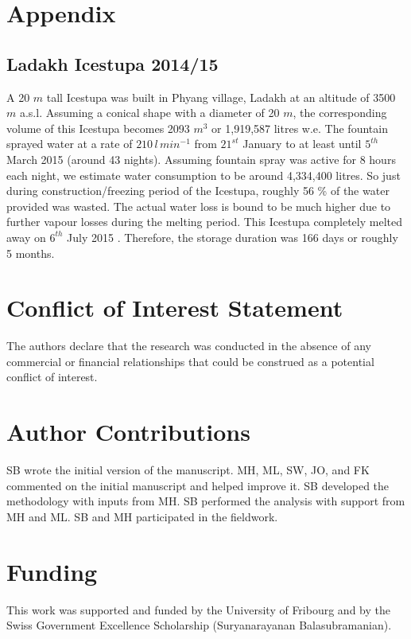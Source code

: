 \documentclass[utf8]{frontiersSCNS} %
\begin{document}
\section{Appendix}

\subsection{Ladakh Icestupa 2014/15} \label{section:ladakhloss} A 20 $m$ tall Icestupa \citep{iceheight} was built in
Phyang village, Ladakh at an altitude of 3500 $m$ a.s.l. Assuming a conical shape with a diameter of 20 $m$, the
corresponding volume of this Icestupa becomes 2093 $m^3$ or 1,919,587 litres w.e. The fountain sprayed water at a rate
of $210\, l\,min^{-1}$ \citep{waterinput} from $21^{st}$ January \citep{waterstart} to at least until $5^{th}$ March
2015 \citep{waterend} (around 43 nights). Assuming fountain spray was active for 8 hours each night, we estimate water
consumption to be around 4,334,400 litres. So just during construction/freezing period of the Icestupa, roughly 56 \%
of the water provided was wasted. The actual water loss is bound to be much higher due to further vapour losses during
the melting period. This Icestupa completely melted away on $6^{th}$ July 2015 \citep{iceends}. Therefore, the storage
duration was 166 days or roughly 5 months. 


\section*{Conflict of Interest Statement} The authors declare that the research was conducted in the absence of any
commercial or financial relationships that could be construed as a potential conflict of interest.

\section*{Author Contributions} SB wrote the initial version of the manuscript. MH, ML, SW, JO, and FK commented on
the initial manuscript and helped improve it. SB developed the methodology with inputs from MH. SB performed the
analysis with support from MH and ML. SB and MH participated in the fieldwork.

\section*{Funding} This work was supported and funded by the University of Fribourg and by the Swiss Government
Excellence Scholarship (Suryanarayanan Balasubramanian).
\end{document}
